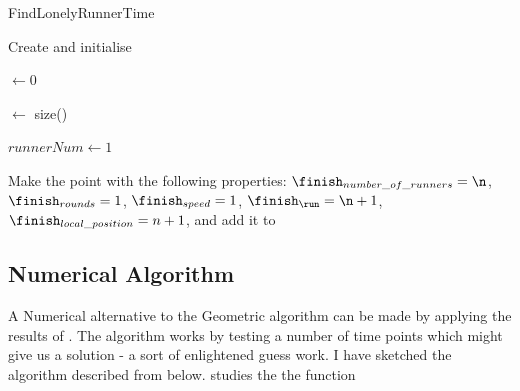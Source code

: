 \begin{algorithm}[H]
  \caption{FindLonelyRunnerTime}
  \highlights

  Create and initialise \li
  
  \inter $\gets 0$
  
  \n $\gets$ size(\s)
  
  $runnerNum \gets 1$
  
  Make the point \finish with the following properties: $\finish_{number\_of\_runners} = \n$, $\finish_{rounds} = 1$, $\finish_{speed} = 1$, $\finish_{\run} = \n + 1$, $\finish_{local\_position} = n + 1$, and add it to \li

  
\end{algorithm}

\subsection{Numerical Algorithm}
\label{numtheory:algo}
A Numerical alternative to the Geometric algorithm can be made by applying the results of \cite{invis}. The algorithm works by testing a number of time points which might give us a solution - a sort of enlightened guess work. I have sketched the algorithm described from \cite{invis} below. \cite{invis} studies the the function 

